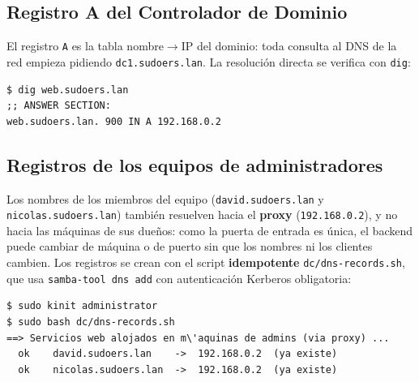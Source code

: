 
\subsection{Registro A del Controlador de Dominio}

El registro \texttt{A} es la tabla nombre$\rightarrow$IP del dominio: toda
consulta al DNS de la red empieza pidiendo \texttt{dc1.sudoers.lan}. La
resoluci\'on directa se verifica con \texttt{dig}:

\begin{lstlisting}[style=terminal]
$ dig web.sudoers.lan
;; ANSWER SECTION:
web.sudoers.lan. 900 IN A 192.168.0.2
\end{lstlisting}


\subsection{Registros de los equipos de administradores}

Los nombres de los miembros del equipo (\texttt{david.sudoers.lan} y
\texttt{nicolas.sudoers.lan}) tambi\'en resuelven hacia el \textbf{proxy}
(\texttt{192.168.0.2}), y no hacia las m\'aquinas de sus due\~nos: como la
puerta de entrada es \'unica, el backend puede cambiar de m\'aquina o de
puerto sin que los nombres ni los clientes cambien. Los registros se crean con
el script \textbf{idempotente} \texttt{dc/dns-records.sh}, que usa
\texttt{samba-tool dns add} con autenticaci\'on Kerberos obligatoria:

\begin{lstlisting}[style=terminal]
$ sudo kinit administrator
$ sudo bash dc/dns-records.sh
==> Servicios web alojados en m\'aquinas de admins (via proxy) ...
  ok    david.sudoers.lan    ->  192.168.0.2  (ya existe)
  ok    nicolas.sudoers.lan  ->  192.168.0.2  (ya existe)
\end{lstlisting}

